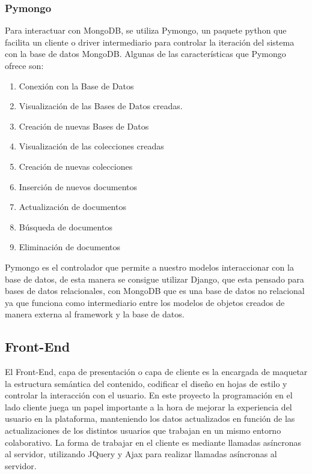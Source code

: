 \documentclass[a4paper,11pt]{book}
\begin{document}
\subsubsection{Pymongo} 
Para interactuar con MongoDB, se utiliza Pymongo\cite{pymongo}, un paquete python que facilita un cliente o driver intermediario para controlar la iteración del sistema con la base de datos MongoDB. Algunas de las características que Pymongo ofrece son:
\begin{enumerate}
\item Conexión con la Base de Datos
\item Visualización de las Bases de Datos creadas.
\item Creación de nuevas Bases de Datos
\item Visualización de las colecciones creadas
\item Creación de nuevas colecciones
\item Inserción de nuevos documentos
\item Actualización de documentos
\item Búsqueda de documentos
\item Eliminación de documentos
\end{enumerate}
Pymongo es el controlador que permite a nuestro modelos interaccionar con la base de datos, de esta manera se consigue utilizar Django, que esta pensado para bases de datos relacionales, con MongoDB que es una base de datos no relacional ya que funciona como intermediario entre los modelos de objetos creados de manera externa al framework y la base de datos.


 
\subsection{Front-End}

El Front-End, capa de presentación o capa de cliente es la encargada de maquetar la estructura semántica del contenido, codificar el diseño en hojas de estilo y controlar la interacción con el usuario. En este proyecto la programación en el lado cliente juega un papel importante a la hora de mejorar la experiencia del usuario en la plataforma, manteniendo los datos actualizados en función de las actualizaciones de los distintos usuarios que trabajan en un mismo entorno colaborativo. La forma de trabajar en el cliente es mediante llamadas asíncronas al servidor, utilizando JQuery y Ajax para realizar llamadas asíncronas al servidor.  
\end{document}
